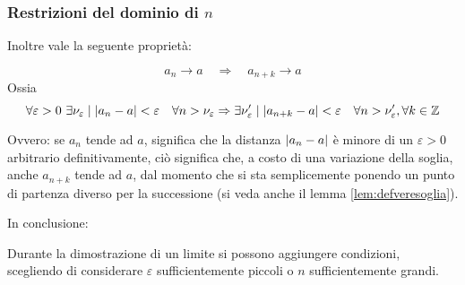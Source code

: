 \subsubsection{Restrizioni del dominio di $n$}
Inoltre vale la seguente proprietà:
\begin{prop}
	\label{suc:trasl}
	\begin{equation}
		a_n\to a \quad\Rightarrow\quad a_{n+k}\to a
	\end{equation}
	Ossia
	\begin{equation*}
		\forall\varepsilon>0~\exists\nu_\varepsilon\mid\left\lvert a_n-a \right\rvert<\varepsilon\quad\forall n>\nu_\varepsilon \Rightarrow \exists\nu'_\varepsilon\mid\left\lvert a_{n+k}-a \right\rvert<\varepsilon\quad\forall n>\nu'_\varepsilon,\forall k\in\mathbb{Z}
	\end{equation*}
\end{prop}
Ovvero: se $a_n$ tende ad $a$, significa che la distanza $\left\lvert a_n-a \right\rvert$ è minore di un $\varepsilon>0$ arbitrario definitivamente, ciò significa che, a costo di una variazione della soglia, anche $a_{n+k}$ tende ad $a$, dal momento che si sta semplicemente ponendo un punto di partenza diverso per la successione (si veda anche il lemma \ref{lem:defveresoglia}).

In conclusione:
\begin{prop}
	\label{prop:epsn}
	Durante la dimostrazione di un limite si possono aggiungere condizioni, scegliendo di considerare $\varepsilon$ sufficientemente piccoli o $n$ sufficientemente grandi.
\end{prop}

